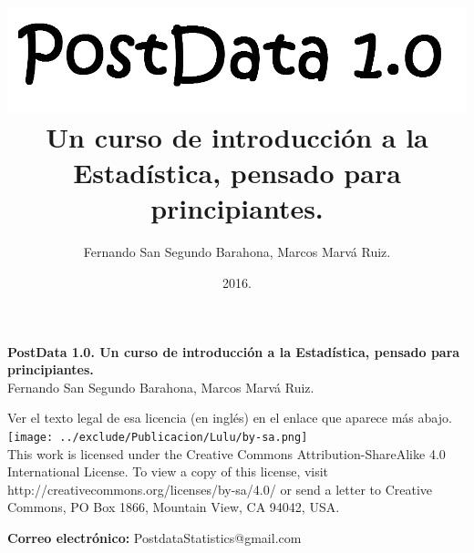 \documentclass[10pt,a4paper]{book}
\begin{document}
\frontmatter
%
%


\author{Fernando San Segundo Barahona, Marcos Marvá Ruiz.}
\title{
\includegraphics[width=14cm]{../fig/frontispicio.png}\\[5mm]
{\small 
Un curso de introducción a la Estadística, pensado para principiantes.}
}
\date{\small 2016.}

\VerbatimFootnotes


\maketitle

\newpage

\thispagestyle{empty}

\small
\noindent \textbf{PostData 1.0. Un curso de introducción a la Estadística, pensado para principiantes. } \\
Fernando San Segundo Barahona, Marcos Marvá Ruiz.

\vspace{1cm}
  Ver el texto legal de esa licencia (en inglés) en el enlace que aparece más abajo.\\
\noindent\texttt{[image: ../exclude/Publicacion/Lulu/by-sa.png]}\\ 
{%
\noindent
This work is licensed under the Creative Commons Attribution-ShareAlike 4.0 International License. To view a copy of this license, visit http://creativecommons.org/licenses/by-sa/4.0/ or send a letter to Creative Commons, PO Box 1866, Mountain View, CA 94042, USA.}

\vspace{2cm}
\noindent
{\bf Correo electrónico:} PostdataStatistics@gmail.com
\end{document}
